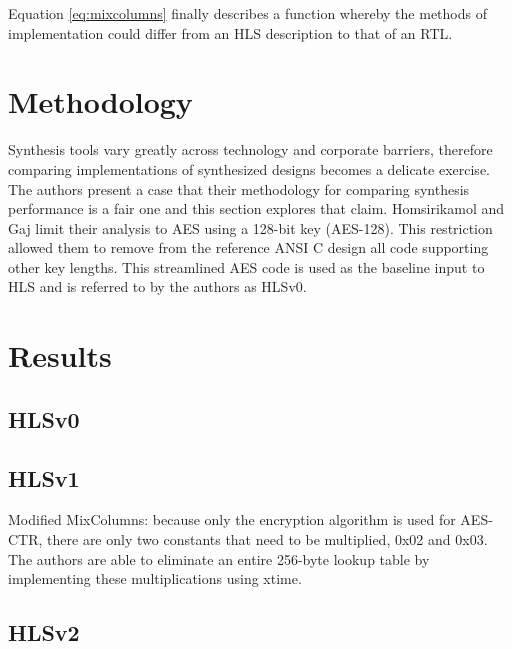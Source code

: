 \documentclass[11pt,journal,compsoc, onecolumn]{IEEEtran}
\begin{document}
Equation \ref{eq:mixcolumns} finally describes a function whereby the methods of implementation could differ from an HLS description to that of an RTL.

%
%
%
%
%
\section{Methodology}
Synthesis tools vary greatly across technology and corporate barriers, therefore comparing implementations of synthesized designs becomes a delicate exercise. The authors present a case that their methodology for comparing synthesis performance is a fair one and this section explores that claim.
Homsirikamol and Gaj limit their analysis to AES using a 128-bit key (AES-128). This restriction allowed them to remove from the reference ANSI C design all code supporting other key lengths\cite{17}. This streamlined AES code is used as the baseline input to HLS and is referred to by the authors as HLSv0.
\section{Results}
\subsection{HLSv0}
\subsection{HLSv1}
Modified MixColumns: because only the encryption algorithm is used for AES-CTR, there are only two constants that need to be multiplied, 0x02 and 0x03. The authors are able to eliminate an entire 256-byte lookup table by implementing these multiplications using xtime.
\subsection{HLSv2}
\end{document}
